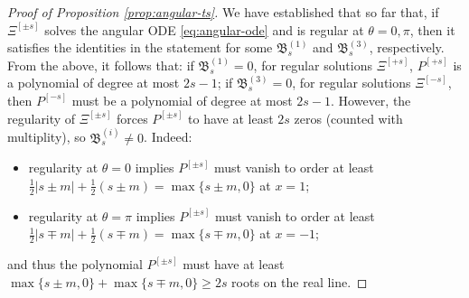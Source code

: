 \documentclass[11pt]{article}
\numberwithin{equation}{section}
\begin{document}
\begin{proof}[Proof of Proposition \ref{prop:angular-ts}]
We have established that so far that, if $\Xi^{[\pm s]}$ solves the angular ODE \eqref{eq:angular-ode} and is regular at $\theta=0,\pi$, then it satisfies the identities in the statement for some $\mathfrak B_s^{(1)}$ and $\mathfrak B_s^{(3)}$, respectively. From  the above, it follows that: if $\mathfrak B_s^{(1)}=0$, for regular solutions $\Xi^{[+s]}$, $P^{[+ s]}$ is a polynomial of degree at most $2s-1$; if $\mathfrak B_s^{(3)}=0$, for regular solutions $\Xi^{[-s]}$, then $P^{[- s]}$ must be a polynomial of degree at most $2s-1$. However, the regularity of $\Xi^{[\pm s]}$ forces $P^{[\pm s]}$ to have at least $2s$ zeros (counted with multiplity), so $\mathfrak B_s^{(i)}\neq 0$. Indeed:
\begin{itemize}
\item regularity at $\theta=0$ implies $P^{[\pm s]}$ must vanish to order at least $\frac12|s\pm m|+\frac12(s\pm m)=\max\{s\pm m,0\}$ at $x=1$;
\item regularity at $\theta=\pi$ implies $P^{[\pm s]}$ must vanish to order at least $\frac12|s\mp m|+\frac12(s\mp m)=\max\{s\mp m,0\}$ at $x=-1$;
\end{itemize} 
and thus the polynomial $P^{[\pm s]}$ must have at least $\max\{s\pm m,0\}+\max\{s\mp m,0\}\geq 2s$ roots on the real line.
\end{proof}
\end{document}
